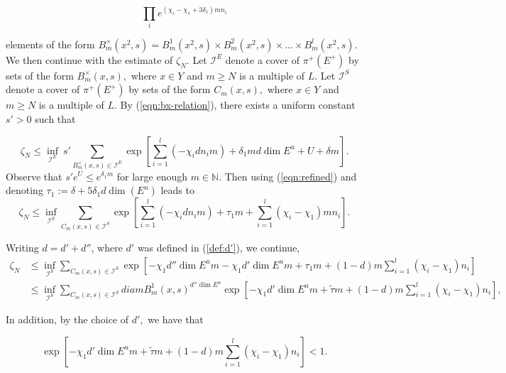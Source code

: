 \documentclass{amsart}
\theoremstyle{plain}
\theoremstyle{definition}
\theoremstyle{remark}
\numberwithin{equation}{section}
\begin{document}
\begin{equation}\label{eqn:refined}
   \prod_i   e^{(\chi_i - \chi_1 + 3\delta_1)m n_i}  
\end{equation}

elements of the form  $B^{\times}_m(x^2,s)= B^1_{m}(x^2,s) \times  B^2_{m}(x^2,s) \times \ldots \times   B^l_m(x^2,s). $\\

We then continue with the estimate of $\zeta_N.$ Let $\mathcal{I}^{E}$ denote a cover of $\pi^+(E^+)$ by sets of the form $B^{\times}_m(x,s),$ where  $x\in Y$ and $ m\geq N$ is a multiple of $L$.
Let $\mathcal{I}^{S}$ denote a cover of $\pi^+(E^+)$ by sets of the form $C_m(x,s),$ where  $x\in Y$ and $ m\geq N$ is a multiple of $L$. By (\ref{eqn:bx-relation}), there exists a uniform constant $s'>0$ such that

$$ \zeta_N \leq  \inf_{\mathcal{I}^{E}} ~ s'   \sum_{B^{\times}_m(x,s)\in\mathcal{I}^E} \exp\left[    \sum_{i=1}^{l}   (-\chi_i    d n_i   m)      + \delta_1 m d   \dim E^u     + U    + \delta m \right] . $$
Observe that $s'e^U\leq e^{\delta_1 m}$ for large enough $m\in\mathbb{N}$. Then using (\ref{eqn:refined}) and denoting $\tau_1:=  \delta + 5\delta_1 d \dim(E^u) $ leads to 
\begin{equation}\label{eqn:zeta}
\zeta_N \leq     \inf_{\mathcal{I}^{S}}    \sum_{C_m(x,s)\in\mathcal{I}^S} \exp\left[    \sum_{i=1}^{l}   (-\chi_i    d n_i   m)      + \tau_1 m    +  \sum_{i=1}^l (\chi_i - \chi_1 )m n_i      \right] . 
\end{equation}
 
Writing $d= d' + d''$, where $d'$ was defined in (\ref{def:d'}),  we continue,
\begin{align*}
\zeta_N   &  \leq     \inf_{\mathcal{I}^{S}}    \sum_{C_m(x,s)\in\mathcal{I}^S}     \exp\left[      -\chi_1 d'' \dim E^u m       -\chi_1 d' \dim E^u m   + \tau_1 m + (1-d)m  \sum_{i=1}^l (\chi_i - \chi_1 ) n_i    \right]   \\
&\leq     \inf_{\mathcal{I}^{S}}    \sum_{C_m(x,s)\in\mathcal{I}^S}     diam B^1_m(x,s)^{d'' \dim E^u}    \exp\left[      -\chi_1 d' \dim E^u m   + \tilde{\tau} m + (1-d)m  \sum_{i=1}^l (\chi_i - \chi_1 ) n_i    \right] ,  
\end{align*}


In addition, by the choice of $d',$ we have that 

$$     \exp\left[      -\chi_1 d' \dim E^u m   + \tilde{\tau} m + (1-d)m  \sum_{i=1}^l (\chi_i - \chi_1 ) n_i    \right] < 1.  $$
\end{document}

